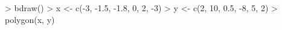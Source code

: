 \begin{Schunk}
\begin{Sinput}
> bdraw()
> x <- c(-3, -1.5, -1.8, 0, 2, -3)
> y <- c(2,   10,    0.5, -8, 5, 2)
> polygon(x, y)
\end{Sinput}
\end{Schunk}

